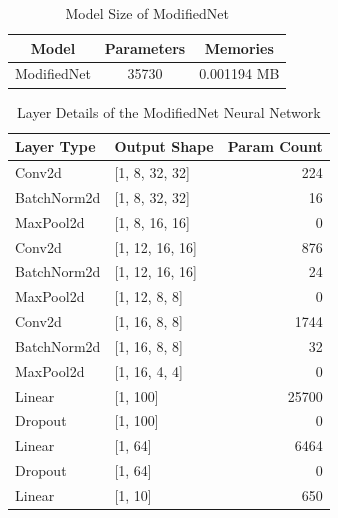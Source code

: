 \documentclass[conference]{IEEEtran}
\begin{document}
\begin{enumerate}
		\begin{table}[h]
			\centering
			\begin{tabular}{|c|c|c|}
				\hline
				\textbf{Model} & \textbf{Parameters} & \textbf{Memories} \\ \hline
				ModifiedNet      &         35730            &       0.001194 MB            \\ \hline
			\end{tabular}
			\caption{Model Size of ModifiedNet}
			\label{tab:mode_size_modified_net}
		\end{table}
		
		\begin{table}[h]
			\centering
			\begin{tabular}{|l|l|r|}
				\hline
				\textbf{Layer Type} & \textbf{Output Shape} & \textbf{Param Count} \\ \hline
				Conv2d              & [1, 8, 32, 32]       & 224                  \\ \hline
				BatchNorm2d         & [1, 8, 32, 32]       & 16                   \\ \hline
				MaxPool2d           & [1, 8, 16, 16]       & 0                    \\ \hline
				Conv2d              & [1, 12, 16, 16]      & 876                  \\ \hline
				BatchNorm2d         & [1, 12, 16, 16]      & 24                   \\ \hline
				MaxPool2d           & [1, 12, 8, 8]        & 0                    \\ \hline
				Conv2d              & [1, 16, 8, 8]        & 1744                 \\ \hline
				BatchNorm2d         & [1, 16, 8, 8]        & 32                   \\ \hline
				MaxPool2d           & [1, 16, 4, 4]        & 0                    \\ \hline
				Linear              & [1, 100]             & 25700                \\ \hline
				Dropout             & [1, 100]             & 0                    \\ \hline
				Linear              & [1, 64]              & 6464                 \\ \hline
				Dropout             & [1, 64]              & 0                    \\ \hline
				Linear              & [1, 10]              & 650                  \\ \hline
			\end{tabular}
			\caption{Layer Details of the ModifiedNet Neural Network}
			\label{tab:modified_network_layers}
		\end{table}
		

\end{enumerate}
\end{document}
